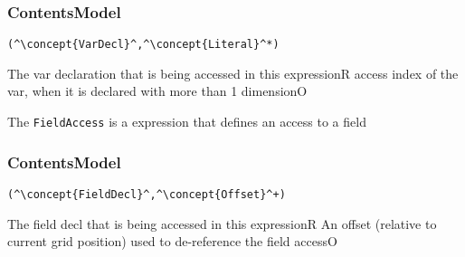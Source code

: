\subsubsection*{ContentsModel}{}

\begin{lstlisting}[style=default]
(^\concept{VarDecl}^,^\concept{Literal}^*)
\end{lstlisting}

\begin{HIRChildElements}
	{The var declaration that is being accessed in this expression}{R}
	{access index of the var, when it is declared with more than 1 dimension}{O}
\end{HIRChildElements}


The {\tt FieldAccess} is a expression that defines an access to a field

\subsubsection*{ContentsModel}{}

\begin{lstlisting}[style=default]
(^\concept{FieldDecl}^,^\concept{Offset}^+)
\end{lstlisting}

\begin{HIRChildElements}
	{The field decl that is being accessed in this expression}{R}
	{An offset (relative to current grid position) used to de-reference the field access}{O}
\end{HIRChildElements}



 
